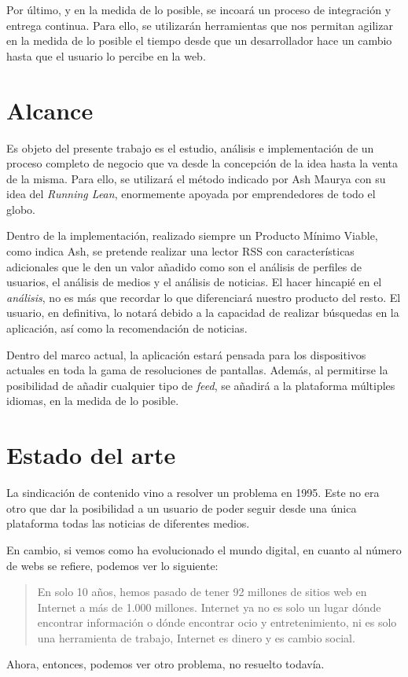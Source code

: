 Por último, y en la medida de lo posible, se incoará un proceso de integración y entrega continua. Para ello, se utilizarán herramientas que nos permitan agilizar en la medida de lo posible el tiempo desde que un desarrollador hace un cambio hasta que el usuario lo percibe en la web.


\section{Alcance}\label{sec:alcance}

Es objeto del presente trabajo es el estudio, análisis e implementación de un proceso completo de negocio que va desde la concepción de la idea hasta la venta de la misma. Para ello, se utilizará el método indicado por Ash Maurya con su idea del \textit{Running Lean}, enormemente apoyada por emprendedores de todo el globo.

Dentro de la implementación, realizado siempre un Producto Mínimo Viable, como indica Ash, se pretende realizar una lector RSS con características adicionales que le den un valor añadido como son el análisis de perfiles de usuarios, el análisis de medios y el análisis de noticias. El hacer hincapié en el \textit{análisis}, no es más que recordar lo que diferenciará nuestro producto del resto. El usuario, en definitiva, lo notará debido a la capacidad de realizar búsquedas en la aplicación, así como la recomendación de noticias.

Dentro del marco actual, la aplicación estará pensada para los dispositivos actuales en toda la gama de resoluciones de pantallas. Además, al permitirse la posibilidad de añadir cualquier tipo de \textit{feed}, se añadirá a la plataforma múltiples idiomas, en la medida de lo posible.


\section{Estado del arte}\label{sec:arte}

La sindicación de contenido vino a resolver un problema en 1995. Este no era otro que dar la posibilidad a un usuario de poder seguir desde una única plataforma todas las noticias de diferentes medios.

En cambio, si vemos como ha evolucionado el mundo digital, en cuanto al número de webs se refiere, podemos ver lo siguiente:

\begin{quote}
	\small En solo 10 años, hemos pasado de tener 92 millones de sitios web en Internet a más de 1.000 millones. Internet ya no es solo un lugar dónde encontrar información o dónde encontrar ocio y entretenimiento, ni es solo una herramienta de trabajo, Internet es dinero y es cambio social.
	\begin{flushright}
	\end{flushright}
\end{quote}

Ahora, entonces, podemos ver otro problema, no resuelto todavía.